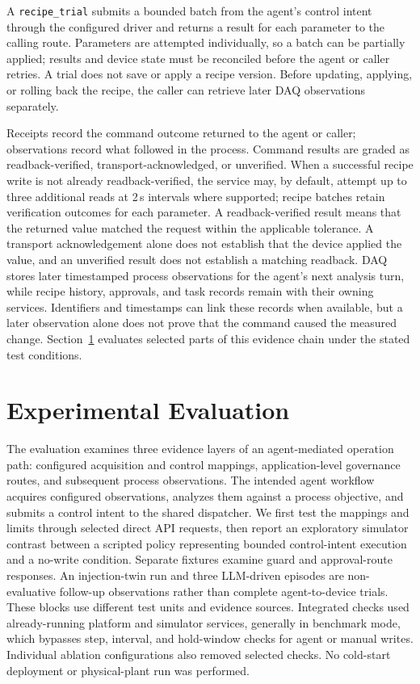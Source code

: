 \documentclass[journal]{IEEEtran}
\begin{document}
A \texttt{recipe\_trial} submits a bounded batch from the agent's control intent through the configured
driver and returns a result for each parameter to the calling route. Parameters are attempted
individually, so a batch can be partially applied; results and device state
must be reconciled before the agent or caller retries. A trial does not save or apply a recipe
version. Before updating, applying, or rolling back the recipe, the caller can
retrieve later DAQ observations separately.

Receipts record the command outcome returned to the agent or caller; observations record what followed in
the process. Command results are graded as readback-verified,
transport-acknowledged, or unverified. When a successful recipe write is not
already readback-verified, the service may, by default, attempt up to three additional
reads at 2\,s intervals where supported; recipe batches retain verification
outcomes for each parameter. A readback-verified result means that the
returned value matched the request within the applicable tolerance. A transport
acknowledgement alone does not establish that the device applied the value, and
an unverified result does not establish a matching readback. DAQ stores later
timestamped process observations for the agent's next analysis turn, while
recipe history, approvals, and task records remain with their owning services.
Identifiers and timestamps can link these records when available, but a later
observation alone does not prove that the command caused the measured change.
Section~\ref{sec:eval} evaluates selected parts of this evidence chain under the
stated test conditions.

  \section{Experimental Evaluation}
\label{sec:eval}
The evaluation examines three evidence layers of an agent-mediated operation path: configured acquisition and control mappings, application-level governance routes, and subsequent process observations. The intended agent workflow acquires configured observations, analyzes them against a process objective, and submits a control intent to the shared dispatcher. We first test the mappings and limits through selected direct API requests, then report an exploratory simulator contrast between a scripted policy representing bounded control-intent execution and a no-write condition. Separate fixtures examine guard and approval-route responses. An injection-twin run and three LLM-driven episodes are non-evaluative follow-up observations rather than complete agent-to-device trials. These blocks use different test units and evidence sources. Integrated checks used already-running platform and simulator services, generally in benchmark mode, which bypasses step, interval, and hold-window checks for agent or manual writes. Individual ablation configurations also removed selected checks. No cold-start deployment or physical-plant run was performed.
\end{document}
